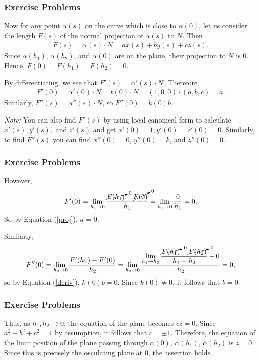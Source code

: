 \documentclass[handout]{beamer}
\theoremstyle{definition}
\theoremstyle{remark}
\newcommand{\ds}{\displaystyle}
\renewcommand{\=}{&=&}
\newcommand{\<}{\langle}
\renewcommand{\>}{\rangle}
\begin{document}
\begin{frame}[t]
\frametitle{Exercise Problems}
\begin{solution}
Now for any point $\alpha(s)$ on the curve which is close to $\alpha(0)$, let us consider the length
$F(s)$ of the normal projection of $\alpha(s)$ to $N$. Then 
\begin{align} \label{proj} F(s) = \alpha(s) \cdot N = a x(s) + b y(s) + c z(s). \end{align}
Since $\alpha(h_1)$, $\alpha(h_2)$, and $\alpha(0)$ are on the plane, their projection to $N$ is
0. Hence, $F(0) = F(h_1) = F(h_2) = 0$.
\pause
\vspace{3mm}

By differentiating, we see that $F'(s) = \alpha'(s) \cdot N$. Therefore 
\begin{align} 
\label{deriv} 
F'(0) = \alpha'(0) \cdot N = t(0) \cdot N = (1,0,0) \cdot (a,b,c) = a. 
\end{align}
Similarly, $F''(s) = \alpha''(s) \cdot N$, so $F''(0) = k(0) b$.
\pause
\vspace{3mm}

\emph{Note:} You can also find $F'(s)$ by using local canonical form to calculate $x'(s), y'(s),$
and $z'(s)$ and get $x'(0) = 1, y'(0) = z'(0) = 0$. Similarly, to find $F''(s)$ you can find $x''(0) = 0$,
$y''(0) = k$, and $z''(0) = 0$.
\end{solution}
\end{frame}

\begin{frame}[t]
\frametitle{Exercise Problems}
\begin{solution}
However,
\[ 
F'(0) = \lim_{h_1 \to 0} \frac{\cancelto{0}{F(h_1)} - \cancelto {0}{F(0)}}{h_1} 
= \lim_{h_1 \to 0} \frac{0}{h_1} = 0,
\]
So by Equation (\ref{proj}), $a = 0$.
\pause
\vspace{3mm}

Similarly,
\[
F''(0) = \lim_{h_2 \to 0} \frac{F'(h_2)-F'(0)}{h_2} 
= \lim_{h_2 \to 0} \frac{\ds \lim_{h_1 \to h_2} \frac{\cancelto{0}{F(h_1)} - \cancelto{0}{F(h_2)}}
	{h_1 - h_2} - 0}{h_2}
= 0,
\]
so by Equation (\ref{deriv}), $k(0) b = 0$. Since $k(0) \ne 0$, it follows that $b = 0$.
\end{solution}
\end{frame}

\begin{frame}[t]
\frametitle{Exercise Problems}
\begin{solution}
Thus, as $h_1,h_2 \to 0$, the equation of the plane becomes $cz = 0$. Since $a^2+b^2+c^2=1$
by assumption, it follows that $c = \pm 1$. Therefore, the equation of the limit position of the
plane passing through $\alpha(0)$, $\alpha(h_1)$, $\alpha(h_2)$ is $z = 0$. Since this is precisely 
the osculating plane at $0$, the assertion holds.
\end{solution}
\end{frame}
\end{document}
